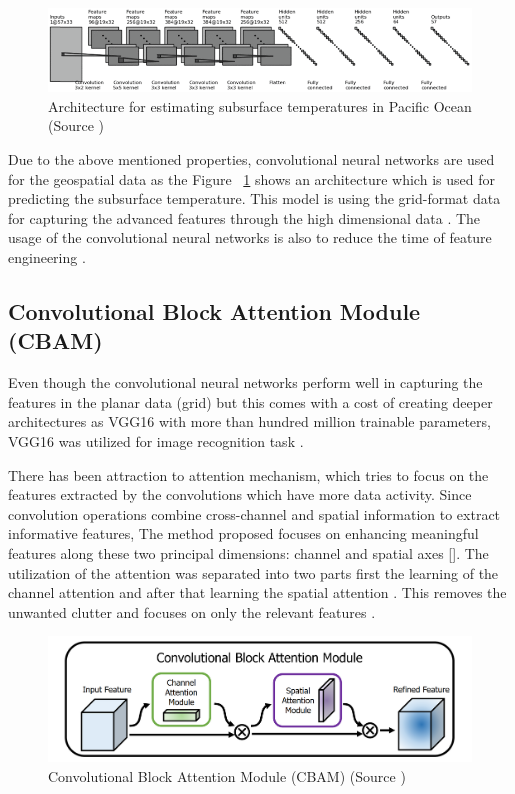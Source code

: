 \begin{figure}[h]
    \centering
    \includegraphics[width=1.0\linewidth]{figures/chapter-4/han3-2955957-large.png}
    \caption{Architecture for estimating subsurface temperatures in Pacific Ocean (Source \cite{8913542}) }
    \label{fig:architecture-pacific-ocean}
\end{figure}

Due to the above mentioned properties, convolutional neural networks are used for the geospatial data as the Figure ~\ref{fig:architecture-pacific-ocean} shows an architecture which is used for predicting the subsurface temperature.
This model is using the grid-format data for capturing the advanced features through the high dimensional data \cite{8913542}. The usage of the convolutional neural networks is also to reduce the time of feature engineering \cite{8913542}.


\subsection{Convolutional Block Attention Module (CBAM)}
Even though the convolutional neural networks perform well in capturing the features in the planar data (grid) but this comes with a cost of creating deeper architectures as VGG16\cite{simonyan2015deep} with more than hundred million trainable parameters, VGG16 was utilized for image recognition task \cite{simonyan2015deep}.

There has been attraction to attention mechanism, which tries to focus on the features extracted by the convolutions which have more data activity.
Since convolution operations combine cross-channel and spatial information to extract informative features, The method proposed \cite{woo2018cbam} focuses on enhancing meaningful features along these two principal dimensions: channel and spatial axes [\cite{woo2018cbam}].
The utilization of the attention was separated into two parts first the learning of the channel attention and after that learning the spatial attention \cite{woo2018cbam}. This removes the unwanted clutter and focuses on only the relevant features \cite{woo2018cbam}.

\begin{figure}[h]
    \centering
    \includegraphics[width=1.0\linewidth]{figures/chapter-4/CBAM.png}
    \caption{Convolutional Block Attention Module (CBAM) (Source \cite{woo2018cbam}) }
    \label{fig:cbam-image}
\end{figure}


